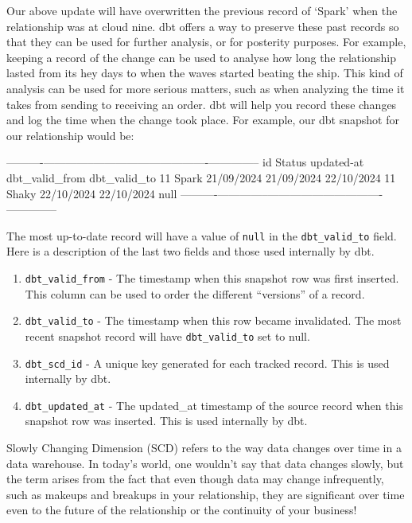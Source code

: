 \documentclass[
]{book}
\begin{document}
Our above update will have overwritten the previous record of `Spark' when the relationship was at cloud nine. dbt offers a way to preserve these past records so that they can be used for further analysis, or for posterity purposes. For example, keeping a record of the change can be used to analyse how long the relationship lasted from its hey days to when the waves started beating the ship. This kind of analysis can be used for more serious matters, such as when analyzing the time it takes from sending to receiving an order. dbt will help you record these changes and log the time when the change took place. For example, our dbt snapshot for our relationship would be:

\textbar----------\textbar--------------\textbar---------------\textbar----------------\textbar--------------\textbar{}
\textbar{} id \textbar{} Status \textbar{} updated-at \textbar{} dbt\_valid\_from \textbar{} dbt\_valid\_to \textbar{}
\textbar{} 11 \textbar{} Spark \textbar{} 21/09/2024 \textbar{} 21/09/2024 \textbar{} 22/10/2024 \textbar{}
\textbar{} 11 \textbar{} Shaky \textbar{} 22/10/2024 \textbar{} 22/10/2024 \textbar{} null \textbar{}
\textbar----------\textbar--------------\textbar---------------\textbar----------------\textbar--------------\textbar{}

The most up-to-date record will have a value of \texttt{null} in the \texttt{dbt\_valid\_to} field. Here is a description of the last two fields and those used internally by dbt.

\begin{enumerate}
\def\labelenumi{\arabic{enumi}.}
\item
  \texttt{dbt\_valid\_from} - The timestamp when this snapshot row was first inserted. This column can be used to order the different ``versions'' of a record.
\item
  \texttt{dbt\_valid\_to} - The timestamp when this row became invalidated. The most recent snapshot record will have \texttt{dbt\_valid\_to} set to null.
\item
  \texttt{dbt\_scd\_id} - A unique key generated for each tracked record. This is used internally by dbt.
\item
  \texttt{dbt\_updated\_at} - The updated\_at timestamp of the source record when this snapshot row was inserted. This is used internally by dbt.
\end{enumerate}

Slowly Changing Dimension (SCD) refers to the way data changes over time in a data warehouse. In today's world, one wouldn't say that data changes slowly, but the term arises from the fact that even though data may change infrequently, such as makeups and breakups in your relationship, they are significant over time even to the future of the relationship or the continuity of your business!
\end{document}
